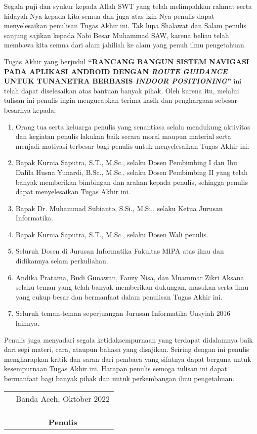 \preface %


Segala puji dan syukur kepada Allah SWT yang telah melimpahkan rahmat serta hidayah-Nya kepada kita semua dan juga atas izin-Nya penulis dapat menyelesaikan penulisan Tugas Akhir ini. Tak lupa Shalawat dan Salam penulis sanjung sajikan kepada Nabi Besar Muhammad SAW, karena beliau telah membawa kita semua dari alam jahiliah ke alam yang penuh ilmu pengetahuan.

Tugas Akhir yang berjudul \textbf{“RANCANG BANGUN SISTEM NAVIGASI PADA APLIKASI ANDROID DENGAN \textit{ROUTE GUIDANCE} UNTUK TUNANETRA BERBASIS \textit{INDOOR POSITIONING}”} ini telah dapat diselesaikan atas bantuan banyak pihak. Oleh karena itu, melalui tulisan ini penulis ingin mengucapkan terima kasih dan penghargaan sebesar-besarnya kepada:

\begin{enumerate}
	\item {Orang tua serta keluarga penulis yang senantiasa selalu mendukung aktivitas dan kegiatan penulis lakukan baik secara moral maupun material serta menjadi motivasi terbesar bagi penulis untuk menyelesaikan Tugas Akhir ini.}
	\item {Bapak Kurnia Saputra, S.T., M.Sc., selaku Dosen Pembimbing I dan Ibu Dalila Husna Yunardi, B.Sc., M.Sc., selaku Dosen Pembimbing II yang telah banyak memberikan bimbingan dan arahan kepada penulis, sehingga penulis dapat menyelesaikan Tugas Akhir ini.}
	\item {Bapak Dr. Muhammad Subianto, S.Si., M.Si., selaku Ketua Jurusan Informatika.}
	\item {Bapak Kurnia Saputra, S.T., M.Sc., selaku Dosen Wali penulis.}
	\item {Seluruh Dosen di Jurusan Informatika Fakultas MIPA atas ilmu dan didikannya selam perkuliahan.}
	\item {Andika Pratama, Budi Gunawan, Fauzy Nisa, dan Muammar Zikri Aksana selaku teman yang telah banyak memberikan dukungan, masukan serta ilmu yang cukup besar dan bermanfaat dalam penulisan Tugas Akhir ini. }
	\item{Seluruh teman-teman seperjuangan Jurusan Informatika Unsyiah 2016 lainnya.}
\end{enumerate}


Penulis juga menyadari segala ketidaksempurnaan yang terdapat didalamnya baik dari segi materi, cara, ataupun bahasa yang disajikan. Seiring dengan ini penulis mengharapkan kritik dan saran dari pembaca yang sifatnya dapat berguna untuk kesempurnaan Tugas Akhir ini. Harapan penulis semoga tulisan ini dapat bermanfaat bagi banyak pihak dan untuk perkembangan ilmu pengetahuan.

\vspace{1cm}


\begin{tabular}{p{7.5cm}c}
	&Banda Aceh, Oktober 2022\\
	&\\
	&\\
	&\\
	&\textbf{Penulis}
\end{tabular}